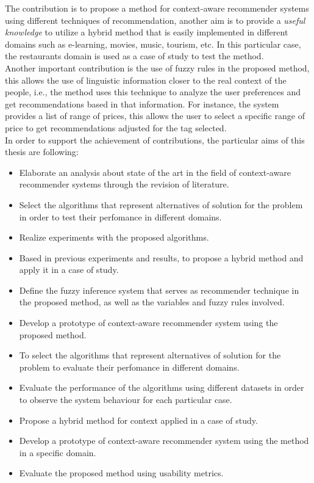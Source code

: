 The contribution is to propose a method for context-aware recommender
systems using different techniques of recommendation, another aim is
to provide a \textit{useful knowledge} to utilize a hybrid method that
is easily implemented in different domains such as e-learning, movies,
music, tourism, etc. In this particular case, the restaurants domain
is used as a case of study to test the method.\\
Another important contribution is the use of fuzzy rules in the
proposed method, this allows the use of linguistic information closer
to the real context of the people, i.e., the method uses this
technique to analyze the user preferences and get recommendations
based in that information. For instance, the system provides a list of
range of prices, this allows the user to select a specific range of
price to get recommendations adjusted for the tag selected.\\ In order
to support the achievement of contributions, the particular aims of
this thesis are following:
\begin{itemize}  
\item Elaborate an analysis about state of the art in the field
of context-aware recommender systems through  the revision of
literature. 
\item Select the algorithms that represent alternatives of
solution for the problem in order to test their perfomance in different
domains.
\item Realize experiments with the proposed algorithms.
\item Based in previous experiments and results, to propose a hybrid
method and apply it in a case of study.
\item Define the fuzzy inference system that serves as recommender
technique in the proposed method, as well as the variables and fuzzy
rules involved.
\item Develop a prototype of context-aware recommender system 
using the proposed method.
\item To select the algorithms that represent alternatives of
solution for the problem to evaluate their perfomance in different
domains.
\item Evaluate the performance of the algorithms using 
different datasets in order to observe the system behaviour 
for each particular case.
\item Propose a hybrid method for context applied in a case of
study.
\item Develop a prototype of context-aware recommender system 
using the method in a specific domain.
\item Evaluate the proposed method using usability metrics.
\end{itemize} 

